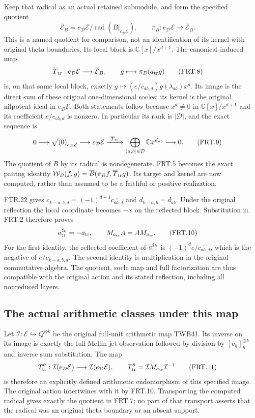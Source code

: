 Keep that radical as an actual retained submodule, and form the
specified quotient
\[
 \overline{\mathcal E}_B
  =e_{\mathcal D}\mathcal E/\operatorname{rad}(B|_{e_{\mathcal D}\mathcal E}),
 \qquad
 \pi_B:e_{\mathcal D}\mathcal E\longrightarrow\overline{\mathcal E}_B.
 \tag{FRT.7}
\]
This is a named quotient for comparison, not an identification of
its kernel with original theta boundaries. Its local block is
$\mathbb C[x]/x^{d+1}$. The canonical induced map
\[
 \overline T_{\rm tr}:e_{\mathcal D}\mathcal E
          \longrightarrow\overline{\mathcal E}_B,
 \qquad g\longmapsto\pi_B(a_{\rm tr}g)
 \tag{FRT.8}
\]
is, on that same local block, exactly
$g\mapsto(e/c_{ab,d})g(\lambda_{ab})x^d$.
Its image is the direct sum of these original one-dimensional socles;
its kernel is the original nilpotent ideal in
$e_{\mathcal D}\mathcal E$. Both statements follow because
$x^d\ne0$ in $\mathbb C[x]/x^{d+1}$ and its coefficient
$e/c_{ab,d}$ is nonzero. In particular its rank is $|\mathcal D|$,
and the exact sequence is
\[
 0\longrightarrow\sqrt{(0)}_{e_{\mathcal D}\mathcal E}
 \longrightarrow e_{\mathcal D}\mathcal E
 \xrightarrow{\ \overline T_{\rm tr}\ }
 \bigoplus_{(a,b)\in\mathcal D}\mathbb C x^{d_{ab}}
 \longrightarrow0.
 \tag{FRT.9}
\]
The quotient of $B$ by its radical is nondegenerate. FRT.5 becomes
the exact pairing identity
$\mathcal W_{\mathcal D}(f,g)=\overline B(\pi_Bf,
\overline T_{\rm tr}g)$. Its target and kernel are now computed,
rather than assumed to be a faithful or positive realization.

FTR.22 gives
$c_{k-a,b,d}=(-1)^{d+1}\overline{c_{ab,d}}$ and
$d_{k-a,b}=d_{ab}$. Under the original reflection the local
coordinate becomes $-x$ on the reflected block. Substitution in
FRT.2 therefore proves
\[
 a_{\rm tr}^{\sharp_k}=-a_{\rm tr},\qquad
 M_{a_{\rm tr}}A=AM_{a_{\rm tr}}.
 \tag{FRT.10}
\]
For the first identity, the reflected coefficient of
$a_{\rm tr}^{\sharp_k}$ is
$(-1)^d e/\overline{c_{ab,d}}$, which is the negative of
$e/c_{k-a,b,d}$. The second identity is multiplication in the
original commutative algebra. The quotient, socle map and full
factorization are thus compatible with the original action and
its stated reflection, including all nonreduced layers.

\subsection{The actual arithmetic classes under this map}

Let $\mathcal I:\mathcal E\hookrightarrow Q^{\otimes k}$ be the
original full-unit arithmetic map TWB41. Its inverse on its image
is exactly the full Mellin-jet observation followed by division by
$[v_h]_h^{\otimes k}$ and inverse sum substitution. The map
\[
 T_{\rm tr}^{\theta}:
 \mathcal I(e_{\mathcal D}\mathcal E)\longrightarrow
 \mathcal I(e_{\mathcal D}\mathcal E),\qquad
 T_{\rm tr}^{\theta}=\mathcal I M_{a_{\rm tr}}\mathcal I^{-1}
 \tag{FRT.11}
\]
is therefore an explicitly defined arithmetic endomorphism of this
specified image. The original action intertwines with it by FRT.10.
Transporting the computed radical gives exactly the quotient in
FRT.7; no part of that transport asserts that the radical was an
original theta boundary or an absent support.

